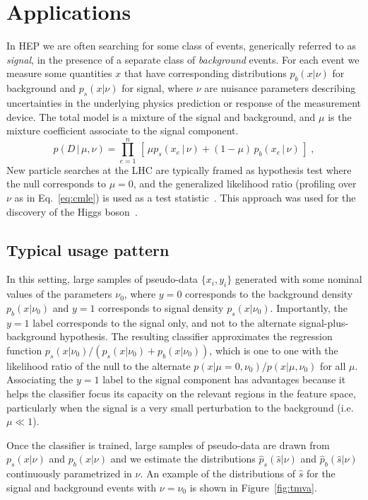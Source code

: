 \documentclass[12pt]{article}
\numberwithin{equation}{section}
\theoremstyle{plain}
\begin{document}
\section{Applications}

In HEP we are often searching for some class of events, generically referred to
as \textit{signal}, in the presence of a separate class of \textit{background}
events.  For each event we measure some quantities $x$ that have corresponding
distributions $p_b(x|\nu)$ for background and $p_s(x|\nu)$ for signal, where
$\nu$ are nuisance parameters describing uncertainties in the underlying physics
prediction or response of the measurement device. The total model is a mixture
of the signal and background, and $\mu$ is the mixture coefficient associate to
the signal component.
\begin{equation}\label{eq:hepGen}
p( D \,|\, \mu, \nu) = \prod_{e=1}^n \, \left[\, \mu p_s( x_e \, |\,  \nu)  + (1-\mu)\, p_b( x_e \,|\, \nu) \,\right] \; ,
\end{equation}
New particle searches at the LHC are typically framed as hypothesis test where
the null corresponds to $\mu=0$, and the generalized likelihood ratio (profiling
over $\nu$ as in Eq.~\ref{eq:cmle}) is used as a test
statistic~\citep{Cowan:2010js}. This approach was used for the discovery of the
Higgs boson~\citep{Aad:2012tfa,Chatrchyan:2012ufa}.

\subsection{Typical usage pattern}

In this setting, large samples of pseudo-data $\{x_i, y_i\}$ generated with some
nominal values of the parameters $\nu_0$, where $y=0$ corresponds to the
background density $p_b(x|\nu_0)$  and $y=1$ corresponds to signal density
$p_s(x|\nu_0)$. Importantly, the $y=1$ label corresponds to the signal only, and
not to the alternate signal-plus-background hypothesis. The resulting classifier
approximates the regression function $p_s(x|\nu_0)/(p_s(x|\nu_0)+p_b(x|\nu_0))$,
which is one to one with the likelihood ratio of the null to the alternate
$p(x|\mu=0,\nu_0)/p(x|\mu,\nu_0)$ for all $\mu$. Associating the $y=1$ label to
the signal component has advantages because it helps the classifier focus its
capacity on the relevant regions in the feature space, particularly when the
signal is a very small perturbation to the background (i.e. $\mu \ll 1$).

 Once the classifier is trained, large samples of pseudo-data are drawn from
 $p_s(x | \nu)$ and $p_b(x | \nu)$ and we estimate the distributions
 $\hat{p}_s(\hat s | \nu)$ and $\hat{p}_b(\hat s | \nu)$ continuously
 parametrized in $\nu$. An example of the distributions of $\hat s$ for the
 signal and background events with $\nu=\nu_0$ is shown in
 Figure~\ref{fig:tmva}.
\end{document}
